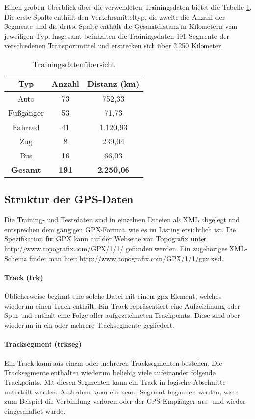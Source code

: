 Einen groben Überblick über die verwendeten Trainingsdaten bietet die Tabelle \ref{datenuebsicht}. Die erste Spalte enthält den Verkehrsmitteltyp, die zweite die Anzahl der Segmente  und die dritte Spalte enthält die Gesamtdistanz in Kilometern vom jeweiligen Typ. Insgesamt beinhalten die Trainingsdaten 191 Segmente der verschiedenen Transportmittel und erstrecken sich über 2.250 Kilometer.

\begin{table}
\centering
\begin{tabular}{| c | c | c | }
\hline
\textbf{Typ} & \textbf{Anzahl} & \textbf{Distanz (km)}\\ 
\hline
Auto & 73 & 752,33\\
\hline
Fußgänger &	53 & 71,73\\
\hline
Fahrrad	& 41 & 1.120,93\\
\hline
Zug & 8 & 239,04\\
\hline
Bus	& 16 & 66,03\\
\hline
\textbf{Gesamt} & \textbf{191} & \textbf{2.250,06}\\
\hline
\end{tabular}
\caption{Trainingsdatenübersicht}
\label{datenuebsicht}
\end{table}

\subsection*{Struktur der GPS-Daten}
Die Training- und Testsdaten sind in einzelnen Dateien als XML abgelegt und entsprechen dem gängigen GPX-Format, wie es im Listing  ersichtlich ist. Die Spezifikation für GPX kann auf der Webseite von Topografix unter \url{ http://www.topografix.com/GPX/1/1/} gefunden werden. Ein zugehöriges XML-Schema findet man hier: \url{http://www.topografix.com/GPX/1/1/gpx.xsd}. \cite{topografix_gpx_2004} 

\paragraph{Track (trk)}
Üblicherweise beginnt eine solche Datei mit einem gpx-Element, welches wiederum einen Track enthält. Ein Track repräsentiert eine Aufzeichnung oder Spur und enthält eine Folge aller aufgezeichneten Trackpoints. Diese sind aber wiederum in ein oder mehrere Tracksegmente gegliedert. \cite{topografix_gpx_2004}

\paragraph{Tracksegment (trkseg)}
Ein Track kann aus einem oder mehreren Tracksegmenten bestehen. Die Tracksegmente enthalten wiederum beliebig viele aufeinander folgende Trackpoints. Mit diesen Segmenten kann ein Track in logische Abschnitte unterteilt werden. Außerdem kann ein neues Segment begonnen werden, wenn zum Beispiel die Verbindung verloren oder der GPS-Empfänger aus- und wieder eingeschaltet wurde. \cite{topografix_gpx_2004}

